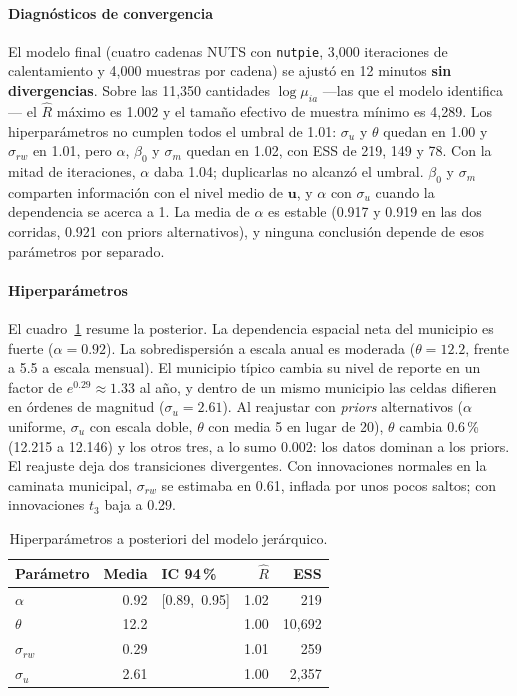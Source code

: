 \paragraph{Diagnósticos de convergencia}
El modelo final (cuatro cadenas NUTS con \texttt{nutpie}, 3,000 iteraciones
de calentamiento y 4,000 muestras por cadena) se ajustó en 12 minutos
\textbf{sin divergencias}. Sobre las 11,350 cantidades $\log\mu_{ia}$ ---las
que el modelo identifica--- el $\hat{R}$ máximo \parencite{vehtari2021rank} es 1.002
y el tamaño efectivo de muestra mínimo es 4,289. Los hiperparámetros no cumplen
todos el umbral de 1.01: $\sigma_u$ y $\theta$ quedan en 1.00 y $\sigma_{rw}$ en
1.01, pero $\alpha$, $\beta_0$ y $\sigma_m$ quedan en 1.02, con ESS de 219, 149
y 78. Con la mitad de iteraciones, $\alpha$ daba 1.04; duplicarlas no alcanzó
el umbral. $\beta_0$ y $\sigma_m$ comparten información con el nivel medio de
$\mathbf{u}$, y $\alpha$ con $\sigma_u$ cuando la dependencia se acerca a 1.
La media de $\alpha$ es estable (0.917 y 0.919 en las dos corridas, 0.921 con
priors alternativos), y ninguna conclusión depende de esos parámetros por
separado.

\paragraph{Hiperparámetros}
El cuadro~\ref{tab:res-hiper} resume la posterior. La dependencia espacial
neta del municipio es fuerte ($\alpha = 0.92$). La sobredispersión a escala
anual es moderada ($\theta = 12.2$, frente a 5.5 a escala mensual). El
municipio típico cambia su nivel de reporte en un factor de
$e^{0.29} \approx 1.33$ al año, y dentro de un mismo municipio las celdas
difieren en órdenes de magnitud ($\sigma_u = 2.61$). Al reajustar con \emph{priors}
alternativos ($\alpha$ uniforme, $\sigma_u$ con escala doble, $\theta$ con
media 5 en lugar de 20), $\theta$ cambia 0.6\,\% (12.215 a
12.146) y los otros tres, a lo sumo 0.002: los datos dominan a los priors. El
reajuste deja dos transiciones divergentes. Con innovaciones normales en la caminata
municipal, $\sigma_{rw}$ se estimaba en 0.61, inflada por unos pocos saltos;
con innovaciones $t_3$ baja a 0.29.

\begin{table}
	\centering\small
	\caption{Hiperparámetros a posteriori del modelo jerárquico.}
	\label{tab:res-hiper}
	\begin{tabular}{@{}lrlrr@{}}
		\toprule
		Parámetro     & Media & IC 94\,\%       & $\hat{R}$ & ESS    \\
		\midrule
		$\alpha$      & 0.92  & [0.89,\ 0.95] & 1.02      & 219    \\
		$\theta$      & 12.2  &                & 1.00      & 10,692 \\
		$\sigma_{rw}$ & 0.29  &                & 1.01      & 259    \\
		$\sigma_u$    & 2.61  &                & 1.00      & 2,357  \\
		\bottomrule
	\end{tabular}
\end{table}

